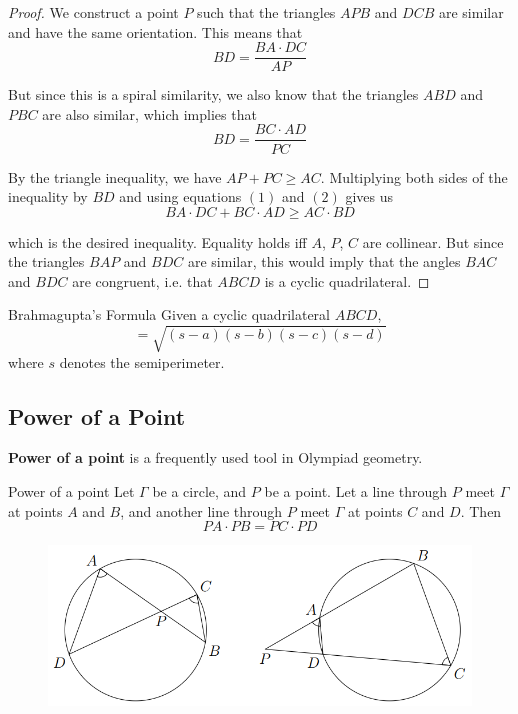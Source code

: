 \begin{proof}
We construct a point $P$ such that the triangles $APB$ and $DCB$ are similar and have the same orientation. This means that
\begin{equation} \tag{1}
BD = \frac{BA \cdot DC}{AP}
\end{equation}

But since this is a spiral similarity, we also know that the triangles $ABD$ and $PBC$ are also similar, which implies that
\begin{equation} \tag{2}
BD = \frac{BC \cdot AD}{PC}
\end{equation}

By the triangle inequality, we have $AP + PC \ge AC$. Multiplying both sides of the inequality by $BD$ and using equations $(1)$ and $(2)$ gives us
\[ BA \cdot DC + BC \cdot AD \ge AC \cdot BD \]

which is the desired inequality. Equality holds iff $A$, $P$, $C$ are collinear. But since the triangles $BAP$ and $BDC$ are similar, this would imply that the angles $BAC$ and $BDC$ are congruent, i.e. that $ABCD$ is a cyclic quadrilateral.
\end{proof}

\begin{thrm}{Brahmagupta's Formula}{} 
Given a cyclic quadrilateral $ABCD$, \begin{equation} [ABCD] = \sqrt{(s-a)(s-b)(s-c)(s-d)} \end{equation} where $s$ denotes the semiperimeter. \end{thrm}
\pagebreak

\subsection{Power of a Point}
\textbf{Power of a point} is a frequently used tool in Olympiad geometry.

\begin{thrm}{Power of a point}{}
Let $\Gamma$ be a circle, and $P$ be a point. Let a line through $P$ meet $\Gamma$ at points $A$ and $B$, and another line through $P$ meet $\Gamma$ at points $C$ and $D$. Then 
\begin{equation}
PA \cdot PB = PC \cdot PD
\end{equation} 
\end{thrm}

\begin{figure}[H]
    \centering
    \includegraphics[width=12cm]{images/Power_of_a_point.png}
\end{figure}

